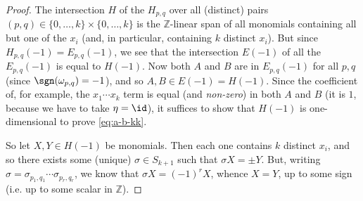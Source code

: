 \begin{proof}
            The intersection $H$ of the $H_{p,q}$ over all (distinct) pairs $(p,q)\in\{0,\ldots,k\}\times\{0,\ldots,k\}$ is the $\mathbb{Z}$-linear span of all monomials containing all but one of the $x_i$ (and, in particular, containing $k$ distinct $x_i$).
            But since $H_{p,q}(-1)=E_{p,q}(-1)$, we see that the intersection $E(-1)$ of all the $E_{p,q}(-1)$ is equal to $H(-1)$.
            Now both $A$ and $B$ are in $E_{p,q}(-1)$ for all $p,q$ (since $\sgn(\omega_{p,q})=-1$), and so $A,B\in E(-1)=H(-1)$.
            Since the coefficient of, for example, the $x_1\cdots x_k$ term is equal (and \emph{non-zero}) in both $A$ and $B$ (it is $1$, because we have to take $\eta=\id$), it suffices to show that $H(-1)$ is one-dimensional to prove \cref{eq:a-b-kk}.

            So let $X,Y\in H(-1)$ be monomials.
            Then each one contains $k$ distinct $x_i$, and so there exists some (unique) $\sigma\in S_{k+1}$ such that $\sigma X=\pm Y$.
            But, writing $\sigma=\sigma_{p_1,q_1}\cdots\sigma_{p_r,q_r}$, we know that $\sigma X=(-1)^r X$, whence $X=Y$, up to some sign (i.e. up to some scalar in $\mathbb{Z}$).
        \end{proof}


